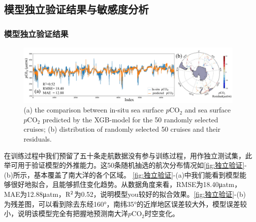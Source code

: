 \subsection{模型独立验证结果与敏感度分析}
\subsubsection{模型独立验证结果}
\begin{figure}[htbp]
    \centering
    \includegraphics[width=\linewidth]{figure/第三章用图/图3.3.jpg}
    {(a) the comparison between in-situ sea surface $p\mathrm{CO_2}$ and sea surface $p\mathrm{CO_2}$ predicted by the XGB-model for the 50 randomly selected cruises; (b) distribution of randomly selected 50 cruises and their residuals.}
\end{figure}

在训练过程中我们预留了五十条走航数据没有参与训练过程，用作独立测试集，此举可用于验证模型的外推能力。这50条随机抽选的航次分布情况如\autoref{fig:独立验证}-(b)所示，基本覆盖了南大洋的各个区域。 \autoref{fig:独立验证}-(a)中我们能看到模型能够很好地拟合，且能够抓住变化趋势。从数据角度来看，RMSE为18.40μatm，MAE为12.88μatm，$\rm R^2$为0.52，说明模型you较好的拟合效果。\autoref{fig:独立验证}-(b)为残差图，可以看到除去东经160°，南纬35°的近岸地区误差较大外，模型误差较小，说明该模型完全有把握地预测南大洋$p\mathrm{CO_2}$时空变化。

